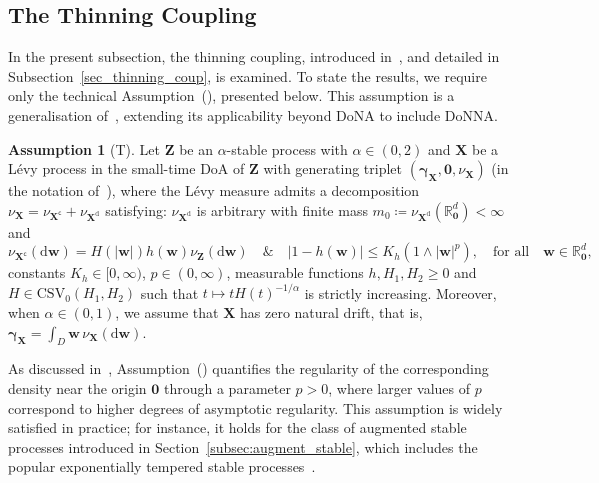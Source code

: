 \documentclass[en,oneside,bbfont,article]{amsart}
\theoremstyle{remark}
\theoremstyle{definition}
\theoremstyle{definition}
\newtheorem*{assumption*}{Assumption}
\newcommand\R{\mathbb{R}}
\newcommand\1{\mathds{1}}
\newcommand\CSV{\mathrm{CSV}}
\renewcommand\le{\leqslant}
\renewcommand\ge{\geqslant}
\newcommand\co{\mathsf{c}}
\newcommand{\D}{\mathrm{d}}
\begin{document}
\subsection{The Thinning Coupling}
\label{subsec:thinning} 
In the present subsection, the thinning coupling, introduced in~\cite[Sec.~3.1]{WassersteinPaper}, and detailed in Subsection~\ref{sec_thinning_coup}, is examined. To state the results, we require only the technical Assumption~(), presented below. This assumption is a generalisation of~\cite[Asm~(T)]{WassersteinPaper}, extending its applicability beyond DoNA to include DoNNA.
\begin{assumption*}[T]
\label{asm:T}
Let $\bm{Z}$ be an $\alpha$-stable process with $\alpha\in(0,2)$ and $\bm{X}$ be a L\'evy process in the small-time DoA of $\bm{Z}$ with generating triplet $(\bm{\gamma}_{\bm{X}},\bm{0},\nu_{\bm{X}})$ (in the notation of~\cite[Def.~8.2]{MR3185174}), where the L\'evy measure admits a decomposition $\nu_{\bm{X}}=\nu_{\bm{X}^\co}+\nu_{\bm{X}^\D}$ satisfying: $\nu_{\bm{X}^\D}$ is arbitrary with finite mass $m_0 \coloneqq \nu_{\bm{X}^\D}(\R^d_{\bm{0}})<\infty$ and
\begin{equation}
\label{eq:TNN}
\nu_{\bm{X}^\co}(\D \bm{w})=H(|\bm w|)h(\bm{w})\nu_{\bm{Z}}(\D \bm{w})
\quad\&\quad
|1-h(\bm{w})|\le K_h(1\wedge |\bm{w}|^p),\quad\text{for all}\quad\bm{w} \in \R^d_{\bm{0}},
\end{equation}
constants $K_h\in[0,\infty)$, $p\in(0,\infty)$, measurable functions $h,H_1,H_2\ge 0$ and $H\in\CSV_0(H_1,H_2)$ such that $t\mapsto tH(t)^{-1/\alpha}$ is strictly increasing. 
Moreover, when $\alpha\in(0,1)$, we assume that $\bm{X}$ has zero natural drift, that is, %
$\bm{\gamma}_{\bm{X}}=\int_D\bm{w}\,\nu_{\bm{X}}(\D\bm{w})$.
\end{assumption*}

As discussed in~\cite[Rem.~2.1]{WassersteinPaper}, Assumption~() quantifies the regularity of the corresponding density near the origin $\bm{0}$ through a parameter $p > 0$, where larger values of $p$ correspond to higher degrees of asymptotic regularity. This assumption is widely satisfied in practice; for instance, it holds for the class of augmented stable processes introduced in Section~\ref{subsec:augment_stable}, which includes the popular exponentially tempered stable processes~\cite{MR2327834}. 
\end{document}
